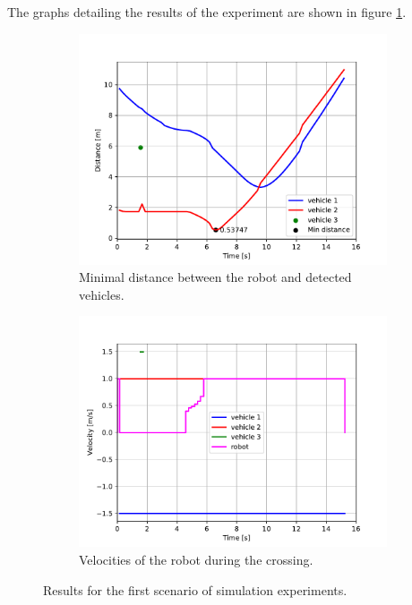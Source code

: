             The graphs detailing the results of the experiment are shown in figure \ref{fig:scene1_graphs}.
            \begin{figure}[H]
                \centering
                \begin{subfigure}{0.49\linewidth}
                    \centering
                    \includegraphics[trim={13 8 40 41}, clip, width=\linewidth]{images/simulations/scene1_dist.pdf}
                    \caption{Minimal distance between the robot and detected vehicles.}
                \end{subfigure}
                \begin{subfigure}{0.49\linewidth}
                    \centering
                    \includegraphics[trim={13 8 40 41}, clip, width=\linewidth]{images/simulations/scene1_vel.pdf}
                    \caption{Velocities of the robot during the crossing.}
                \end{subfigure}
                \caption{Results for the first scenario of simulation experiments.}
                \label{fig:scene1_graphs}
            \end{figure}
